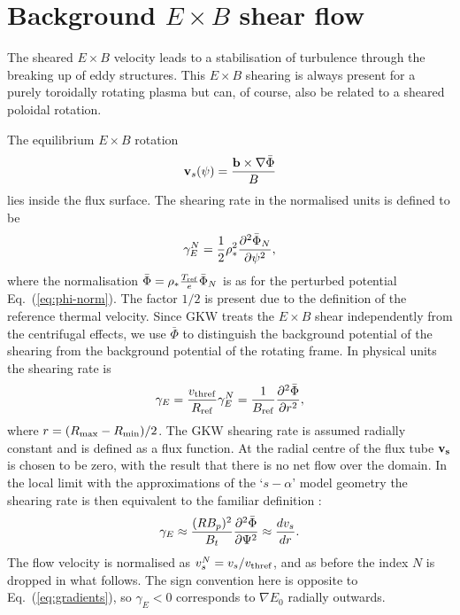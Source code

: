\section{Background \texorpdfstring{$E \times B$}{E x B} shear flow}

The sheared $E\times B$ velocity leads to a stabilisation of turbulence through the breaking up of eddy structures. 
This $E\times B$ shearing is always present for a purely toroidally rotating plasma but can, of course, also be related 
to a sheared poloidal rotation. 


The equilibrium $E \times B$ rotation 
\begin{equation}
{\bf v}_s(\psi)= {{\bf b} \times \nabla \bar{\Phi} \over B} 
\end{equation}
lies inside the flux surface.  The shearing rate in the normalised units is defined to be 
\begin{equation}
\gamma_{E}^N = {1 \over 2}\rho_*^2 {\partial^2 \bar{\Phi}_N \over \partial \psi^2} ,
\label{gamma-E}
\end{equation}
where the normalisation $\bar{\Phi}= \rho_* {T_{\rm ref} \over e}\bar{\Phi}_N$ is as for the
perturbed potential Eq.~(\ref{eq:phi-norm}).  The factor $1/2$ is present due to the definition of the
reference thermal velocity.  Since GKW treats the $E \times B$ shear independently from the centrifugal effects,
we use $\bar{\Phi}$ to distinguish the background potential of the shearing from the background potential of the rotating frame.
In physical units the shearing rate is
\begin{equation}
\gamma_E = {v_{\rm thref} \over R_{\rm ref}} \gamma_E^N = 
{1 \over B_{\rm ref}}{\partial^2 \bar{\Phi} \over \partial r^2} ,
\end{equation}
where $r=(R_{\rm max}-R_{\rm min})/2$.  The GKW shearing rate is assumed
radially constant and is defined as a flux function.  At the radial centre of the flux tube
$\bf{v_s}$ is chosen to be zero, with the result that there is no net flow over the domain.  In the
local limit with the approximations of the `$s-\alpha$' model geometry
the shearing rate is then equivalent to the familiar definition \cite{Hahm95,Burrell97}:
\begin{equation}
\gamma_E \approx {(RB_p)^2 \over B_t}{\partial^2 \bar{\Phi} \over \partial \Psi^2}
\approx {d v_s \over d r} .
\end{equation}
The flow velocity is normalised as $v_s^N=v_s / v_{\rm thref}$, and as before the index $N$ is dropped in what follows.
The sign convention here is opposite to Eq.~(\ref{eq:gradients}), so $\gamma_E<0$ corresponds to 
$\nabla E_0$ radially outwards.

